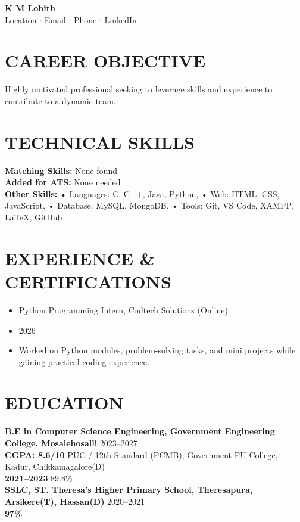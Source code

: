 \documentclass[10pt,a4paper]{article}
\begin{document}
\begin{center}
    {\Huge \textbf{K M Lohith}} \\
    \vspace{5pt}
    Location $\cdot$ Email $\cdot$ Phone $\cdot$ LinkedIn
\end{center}

\vspace{10pt}

\section*{CAREER OBJECTIVE}
\noindent Highly motivated professional seeking to leverage skills and experience to contribute to a dynamic team.

\section*{TECHNICAL SKILLS}
\textbf{Matching Skills:} None found \\
\textbf{Added for ATS:} None needed \\
\textbf{Other Skills:} • Languages: C, C++, Java, Python, • Web: HTML, CSS, JavaScript, • Database: MySQL, MongoDB, • Tools: Git, VS Code, XAMPP, LaTeX, GitHub

\section*{EXPERIENCE \& CERTIFICATIONS}
\begin{itemize}[leftmargin=*]
    \item Python Programming Intern, Codtech Solutions (Online)
    \item 2026
    \item Worked on Python modules, problem-solving tasks, and mini projects while gaining practical coding experience.
\end{itemize}

\section*{EDUCATION}
\noindent \textbf{B.E in Computer Science Engineering, Government Engineering College, Mosalehosalli} \hfill 2023–2027\\
\noindent \textbf{CGPA: 8.6/10} \hfill PUC / 12th Standard (PCMB), Government PU College, Kadur, Chikkamagalore(D)\\
\noindent \textbf{2021–2023} \hfill 89.8\%\\
\noindent \textbf{SSLC, ST. Theresa’s Higher Primary School, Theresapura, Arsikere(T), Hassan(D)} \hfill 2020–2021\\
\noindent \textbf{97\%} \hfill \\
\end{document}
